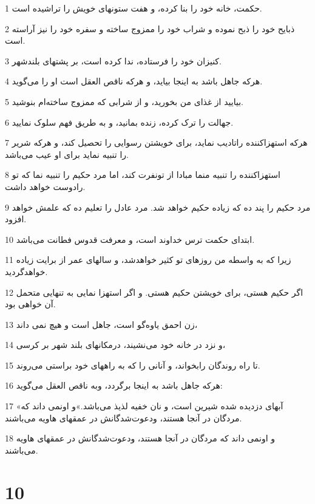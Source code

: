 \par 1 حکمت، خانه خود را بنا کرده، و هفت ستونهای خویش را تراشیده است.
\par 2 ذبایح خود را ذبح نموده و شراب خود را ممزوج ساخته و سفره خود را نیز آراسته است.
\par 3 کنیزان خود را فرستاده، ندا کرده است، بر پشتهای بلندشهر.
\par 4 هر‌که جاهل باشد به اینجا بیاید، و هر‌که ناقص العقل است او را می‌گوید.
\par 5 بیایید از غذای من بخورید، و از شرابی که ممزوج ساخته‌ام بنوشید.
\par 6 جهالت را ترک کرده، زنده بمانید، و به طریق فهم سلوک نمایید.
\par 7 هر‌که استهزاکننده راتادیب نماید، برای خویشتن رسوایی را تحصیل کند، و هر‌که شریر را تنبیه نماید برای او عیب می‌باشد.
\par 8 استهزاکننده را تنبیه منما مبادا از تونفرت کند، اما مرد حکیم را تنبیه نما که تو رادوست خواهد داشت.
\par 9 مرد حکیم را پند ده که زیاده حکیم خواهد شد. مرد عادل را تعلیم ده که علمش خواهد افزود.
\par 10 ابتدای حکمت ترس خداوند است، و معرفت قدوس فطانت می‌باشد.
\par 11 زیرا که به واسطه من روزهای تو کثیر خواهدشد، و سالهای عمر از برایت زیاده خواهدگردید.
\par 12 اگر حکیم هستی، برای خویشتن حکیم هستی. و اگر استهزا نمایی به تنهایی متحمل آن خواهی بود.
\par 13 زن احمق یاوه‌گو است، جاهل است و هیچ نمی داند، 
\par 14 و نزد در خانه خود می‌نشیند، درمکانهای بلند شهر بر کرسی،
\par 15 تا راه روندگان رابخواند، و آنانی را که به راههای خود براستی می‌روند.
\par 16 هر‌که جاهل باشد به اینجا برگردد، وبه ناقص العقل می‌گوید:
\par 17 «آبهای دزدیده شده شیرین است، و نان خفیه لذیذ می‌باشد.»و اونمی داند که مردگان در آنجا هستند، ودعوت‌شدگانش در عمقهای هاویه می‌باشند.
\par 18 و اونمی داند که مردگان در آنجا هستند، ودعوت‌شدگانش در عمقهای هاویه می‌باشند.
 
\chapter{10}

